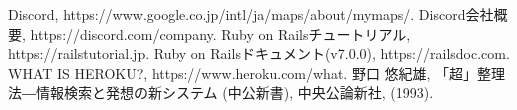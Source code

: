 \documentclass[a4j,twocolumn]{jsarticle}
\begin{document}
\small\setlength\baselineskip{10pt}
\begin{thebibliography}{9}
Discord, https://www.google.co.jp/intl/ja/maps/about/mymaps/.
 Discord会社概要, https://discord.com/company.
 Ruby on Railsチュートリアル, https://railstutorial.jp.
 Ruby on Railsドキュメント(v7.0.0), https://railsdoc.com.
 WHAT IS HEROKU?, https://www.heroku.com/what.
 野口 悠紀雄, 「超」整理法―情報検索と発想の新システム (中公新書), 中央公論新社, (1993).
\end{thebibliography}
\end{document}
